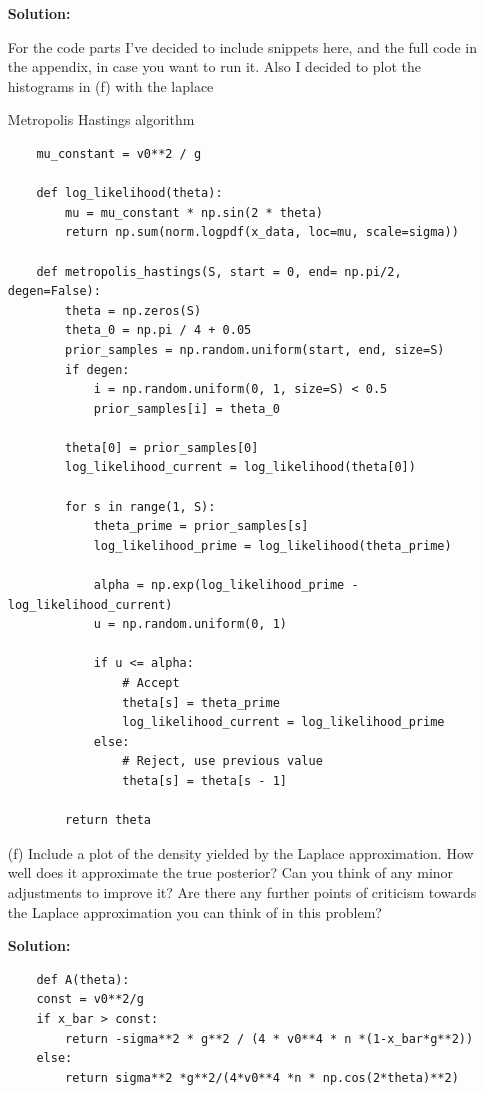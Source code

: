 \documentclass{article}
\begin{document}
\begin{enumerate}
\textbf{Solution:}
\par
For the code parts I've decided to include snippets here, and the full code in the appendix,
in case you want to run it. Also I decided to plot the histograms in (f) with the laplace

Metropolis Hastings algorithm
\begin{verbatim}
    mu_constant = v0**2 / g

    def log_likelihood(theta):
        mu = mu_constant * np.sin(2 * theta)
        return np.sum(norm.logpdf(x_data, loc=mu, scale=sigma))

    def metropolis_hastings(S, start = 0, end= np.pi/2, degen=False):
        theta = np.zeros(S)
        theta_0 = np.pi / 4 + 0.05
        prior_samples = np.random.uniform(start, end, size=S)
        if degen:
            i = np.random.uniform(0, 1, size=S) < 0.5
            prior_samples[i] = theta_0 
            
        theta[0] = prior_samples[0]
        log_likelihood_current = log_likelihood(theta[0])

        for s in range(1, S):
            theta_prime = prior_samples[s]
            log_likelihood_prime = log_likelihood(theta_prime)
    
            alpha = np.exp(log_likelihood_prime - log_likelihood_current)
            u = np.random.uniform(0, 1)
            
            if u <= alpha:
                # Accept
                theta[s] = theta_prime
                log_likelihood_current = log_likelihood_prime
            else:
                # Reject, use previous value
                theta[s] = theta[s - 1]
        
        return theta
\end{verbatim}



\item[(f)] Include a plot of the density yielded by the Laplace approximation. How
well does it approximate the true posterior? Can you think of any minor
adjustments to improve it? Are there any further points of criticism towards
the Laplace approximation you can think of in this problem?



\textbf{Solution:}
\par

\begin{verbatim}
    def A(theta):
    const = v0**2/g
    if x_bar > const:
        return -sigma**2 * g**2 / (4 * v0**4 * n *(1-x_bar*g**2))
    else:
        return sigma**2 *g**2/(4*v0**4 *n * np.cos(2*theta)**2)
    


\end{verbatim}
\end{enumerate}
\end{document}
